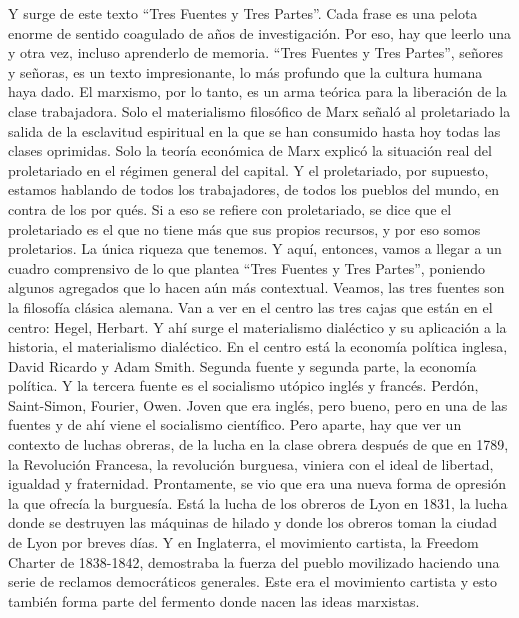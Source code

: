 \documentclass[
  jou,
  floatsintext,
  longtable,
  a4paper,
  nolmodern,
  notxfonts,
  notimes,
  colorlinks=true,linkcolor=blue,citecolor=blue,urlcolor=blue]{apa7}
\begin{document}
Y surge de este texto ``Tres Fuentes y Tres Partes''. Cada frase es una
pelota enorme de sentido coagulado de años de investigación. Por eso,
hay que leerlo una y otra vez, incluso aprenderlo de memoria. ``Tres
Fuentes y Tres Partes'', señores y señoras, es un texto impresionante,
lo más profundo que la cultura humana haya dado. El marxismo, por lo
tanto, es un arma teórica para la liberación de la clase trabajadora.
Solo el materialismo filosófico de Marx señaló al proletariado la salida
de la esclavitud espiritual en la que se han consumido hasta hoy todas
las clases oprimidas. Solo la teoría económica de Marx explicó la
situación real del proletariado en el régimen general del capital. Y el
proletariado, por supuesto, estamos hablando de todos los trabajadores,
de todos los pueblos del mundo, en contra de los por qués. Si a eso se
refiere con proletariado, se dice que el proletariado es el que no tiene
más que sus propios recursos, y por eso somos proletarios. La única
riqueza que tenemos. Y aquí, entonces, vamos a llegar a un cuadro
comprensivo de lo que plantea ``Tres Fuentes y Tres Partes'', poniendo
algunos agregados que lo hacen aún más contextual. Veamos, las tres
fuentes son la filosofía clásica alemana. Van a ver en el centro las
tres cajas que están en el centro: Hegel, Herbart. Y ahí surge el
materialismo dialéctico y su aplicación a la historia, el materialismo
dialéctico. En el centro está la economía política inglesa, David
Ricardo y Adam Smith. Segunda fuente y segunda parte, la economía
política. Y la tercera fuente es el socialismo utópico inglés y francés.
Perdón, Saint-Simon, Fourier, Owen. Joven que era inglés, pero bueno,
pero en una de las fuentes y de ahí viene el socialismo científico. Pero
aparte, hay que ver un contexto de luchas obreras, de la lucha en la
clase obrera después de que en 1789, la Revolución Francesa, la
revolución burguesa, viniera con el ideal de libertad, igualdad y
fraternidad. Prontamente, se vio que era una nueva forma de opresión la
que ofrecía la burguesía. Está la lucha de los obreros de Lyon en 1831,
la lucha donde se destruyen las máquinas de hilado y donde los obreros
toman la ciudad de Lyon por breves días. Y en Inglaterra, el movimiento
cartista, la Freedom Charter de 1838-1842, demostraba la fuerza del
pueblo movilizado haciendo una serie de reclamos democráticos generales.
Este era el movimiento cartista y esto también forma parte del fermento
donde nacen las ideas marxistas.
\end{document}

